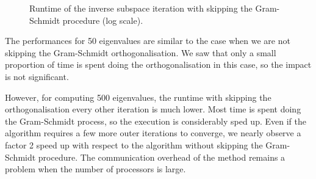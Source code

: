 \begin{figure}[H]
  \centering
  
  \caption{Runtime of the inverse subspace iteration with skipping the Gram-Schmidt procedure (log scale).}
\end{figure}

The performances for 50 eigenvalues are similar to the case when we are not skipping the Gram-Schmidt orthogonalisation.
We saw that only a small proportion of time is spent doing the orthogonalisation in this case, so the impact is not significant.

However, for computing 500 eigenvalues, the runtime with skipping the orthogonalisation every other iteration is much lower.
Most time is spent doing the Gram-Schmidt process, so the execution is considerably sped up.
Even if the algorithm requires a few more outer iterations to converge, we nearly observe a factor 2 speed up with respect to the algorithm without skipping the Gram-Schmidt procedure.
The communication overhead of the method remains a problem when the number of processors is large.
